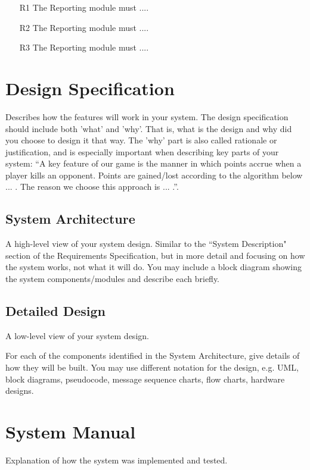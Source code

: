 \documentclass[12pt, a4paper]{report}
\begin{document}
	\begin{itemize}
		\item[R1] The Reporting module must  ....
		\item[R2] The Reporting module must  ....
		\item[R3] The Reporting module must  ....
	\end{itemize}

\chapter{Design Specification}
Describes how the features will work in your system. The design specification should include both 'what' and 'why'. That is, what is the design and why did you choose to design it that way. The 'why' part is also called rationale or justification, and is especially important when describing key parts of your system: “A key feature of our game is the manner in which points accrue when a player kills an opponent. Points are gained/lost according to the algorithm below ... . The reason we choose this approach is ... .”.


\section{System Architecture}
A high-level view of your system design. Similar to the ``System Description" section of the Requirements Specification, but in more detail and focusing on how the system works, not what it will do. You may include a block diagram showing the system components/modules and describe each briefly.


\section{Detailed Design}
A low-level view of your system design.

For each of the components identified in the System Architecture, give details of how they will be built. You may use different notation for the design, e.g. UML, block diagrams, pseudocode, message sequence charts, flow charts, hardware designs.



\chapter{System Manual}

Explanation of how the system was implemented and tested.
\end{document}

